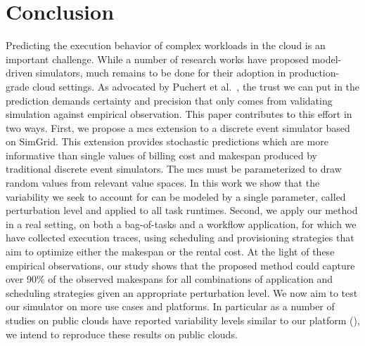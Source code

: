 \documentclass[]{llncs}
\begin{document}
\section{Conclusion}
Predicting  the execution  behavior  of complex  workloads in  the  cloud is  an
important challenge. While a number of research works have proposed model-driven
simulators, much remains to be done for their adoption in production-grade cloud
settings. As  advocated by Puchert  et al.~\cite{PucherGWK15}, the trust  we can
put in  the prediction  demands certainty  and precision  that only  comes from
validating simulation against empirical observation.
%
This paper contributes to this effort in two ways. First, we propose a \acl{mcs}
extension  to a  discrete  event  simulator based  on  SimGrid.  This  extension
provides stochastic predictions which are more informative than single values of
billing cost  and makespan  produced by  traditional discrete  event simulators.
The \acl{mcs}  must be parameterized to  draw random values from  relevant value
spaces. In this work we show that the  variability we seek to account for can be
modeled  by a  single parameter,  called perturbation  level and applied  to all
task runtimes. Second, we apply our method in  a real setting, on both a
bag-of-tasks and a workflow  application, for which we have collected  execution
traces, using scheduling and provisioning strategies that  aim to optimize
either the makespan or the  rental cost.  At  the light of  these empirical
observations,  our study shows that the proposed method could capture over 90\%
of the observed makespans for  all  combinations  of  application   and
scheduling  strategies  given  an appropriate perturbation  level. We now aim
to test our simulator  on more use cases and platforms.  In particular as a
number of studies on public clouds have reported variability levels similar to
our platform (\cite{LeitnerC16,pics}), we intend to reproduce these results on
public clouds.



\end{document}
